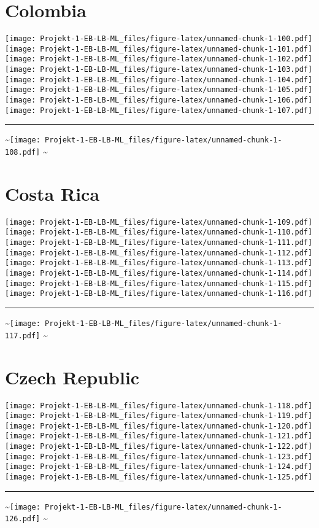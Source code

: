 \documentclass[]{article}
\begin{document}
\section{Colombia}\label{colombia}

\texttt{[image: Projekt-1-EB-LB-ML\_files/figure-latex/unnamed-chunk-1-100.pdf]}
\texttt{[image: Projekt-1-EB-LB-ML\_files/figure-latex/unnamed-chunk-1-101.pdf]}
\texttt{[image: Projekt-1-EB-LB-ML\_files/figure-latex/unnamed-chunk-1-102.pdf]}
\texttt{[image: Projekt-1-EB-LB-ML\_files/figure-latex/unnamed-chunk-1-103.pdf]}
\texttt{[image: Projekt-1-EB-LB-ML\_files/figure-latex/unnamed-chunk-1-104.pdf]}
\texttt{[image: Projekt-1-EB-LB-ML\_files/figure-latex/unnamed-chunk-1-105.pdf]}
\texttt{[image: Projekt-1-EB-LB-ML\_files/figure-latex/unnamed-chunk-1-106.pdf]}
\texttt{[image: Projekt-1-EB-LB-ML\_files/figure-latex/unnamed-chunk-1-107.pdf]}
\bigskip\hrule\bigskip
\textasciitilde{}\hfill\texttt{[image: Projekt-1-EB-LB-ML\_files/figure-latex/unnamed-chunk-1-108.pdf]}
\hfill \textasciitilde{} \vfill\eject

\section{Costa Rica}\label{costa-rica}

\texttt{[image: Projekt-1-EB-LB-ML\_files/figure-latex/unnamed-chunk-1-109.pdf]}
\texttt{[image: Projekt-1-EB-LB-ML\_files/figure-latex/unnamed-chunk-1-110.pdf]}
\texttt{[image: Projekt-1-EB-LB-ML\_files/figure-latex/unnamed-chunk-1-111.pdf]}
\texttt{[image: Projekt-1-EB-LB-ML\_files/figure-latex/unnamed-chunk-1-112.pdf]}
\texttt{[image: Projekt-1-EB-LB-ML\_files/figure-latex/unnamed-chunk-1-113.pdf]}
\texttt{[image: Projekt-1-EB-LB-ML\_files/figure-latex/unnamed-chunk-1-114.pdf]}
\texttt{[image: Projekt-1-EB-LB-ML\_files/figure-latex/unnamed-chunk-1-115.pdf]}
\texttt{[image: Projekt-1-EB-LB-ML\_files/figure-latex/unnamed-chunk-1-116.pdf]}
\bigskip\hrule\bigskip
\textasciitilde{}\hfill\texttt{[image: Projekt-1-EB-LB-ML\_files/figure-latex/unnamed-chunk-1-117.pdf]}
\hfill \textasciitilde{} \vfill\eject

\section{Czech Republic}\label{czech-republic}

\texttt{[image: Projekt-1-EB-LB-ML\_files/figure-latex/unnamed-chunk-1-118.pdf]}
\texttt{[image: Projekt-1-EB-LB-ML\_files/figure-latex/unnamed-chunk-1-119.pdf]}
\texttt{[image: Projekt-1-EB-LB-ML\_files/figure-latex/unnamed-chunk-1-120.pdf]}
\texttt{[image: Projekt-1-EB-LB-ML\_files/figure-latex/unnamed-chunk-1-121.pdf]}
\texttt{[image: Projekt-1-EB-LB-ML\_files/figure-latex/unnamed-chunk-1-122.pdf]}
\texttt{[image: Projekt-1-EB-LB-ML\_files/figure-latex/unnamed-chunk-1-123.pdf]}
\texttt{[image: Projekt-1-EB-LB-ML\_files/figure-latex/unnamed-chunk-1-124.pdf]}
\texttt{[image: Projekt-1-EB-LB-ML\_files/figure-latex/unnamed-chunk-1-125.pdf]}
\bigskip\hrule\bigskip
\textasciitilde{}\hfill\texttt{[image: Projekt-1-EB-LB-ML\_files/figure-latex/unnamed-chunk-1-126.pdf]}
\hfill \textasciitilde{} \vfill\eject
\end{document}

